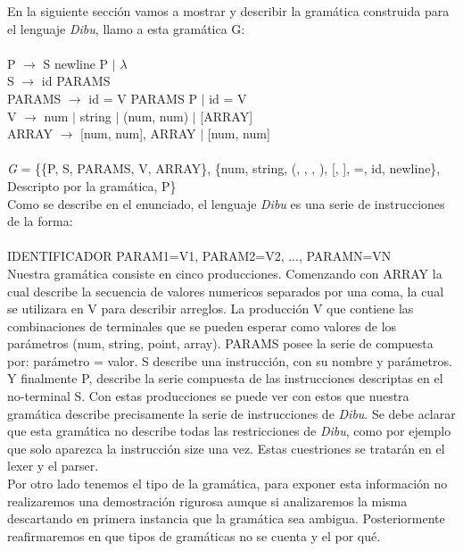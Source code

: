 En la siguiente sección vamos a mostrar y describir la gramática construida para el lenguaje \textit{Dibu}, llamo a esta
gramática G:\\
\\
P $\rightarrow$ S newline P $\mid$ $\lambda$\\
S $\rightarrow$ id PARAMS\\
PARAMS $\rightarrow$  id = V PARAMS P $\mid$ id = V\\
V $\rightarrow$ num $\mid$ string $\mid$ (num, num) $\mid$ [ARRAY]\\
ARRAY $\rightarrow$ [num, num], ARRAY $\mid$ [num, num]\\
\\
\textit{G} = \{\{P, S, PARAMS, V, ARRAY\}, \{num, string, (, , , ), [, ], =, id, newline\}, Descripto por la gramática, P\}\\

Como se describe en el enunciado, el lenguaje \textit{Dibu} es una serie de instrucciones de la forma:\\
\\
IDENTIFICADOR PARAM1=V1, PARAM2=V2, ..., PARAMN=VN\\

Nuestra gramática consiste en cinco producciones. Comenzando con ARRAY la cual describe la secuencia de valores numericos
separados por una coma, la cual se utilizara en V para describir arreglos. La producción V que contiene las combinaciones
de terminales que se pueden esperar como valores de los parámetros (num, string, point, array).
PARAMS posee la serie de compuesta por: parámetro = valor. S describe una instrucción, con su nombre y parámetros. Y
finalmente P, describe la serie compuesta de las instrucciones descriptas en el no-terminal S. Con estas producciones se
puede ver con estos que nuestra gramática describe precisamente la serie de instrucciones de \textit{Dibu}. Se debe
aclarar que esta gramática no describe todas las restricciones de \textit{Dibu}, como por ejemplo que solo aparezca la
instrucción size una vez. Estas cuestriones se tratarán en el lexer y el parser.\\

Por otro lado tenemos el tipo de la gramática, para exponer esta información no realizaremos una demostración rigurosa
aunque si analizaremos la misma descartando en primera instancia que la gramática sea ambigua. Posteriormente reafirmaremos
en que tipos de gramáticas no se cuenta y el por qué.\\

